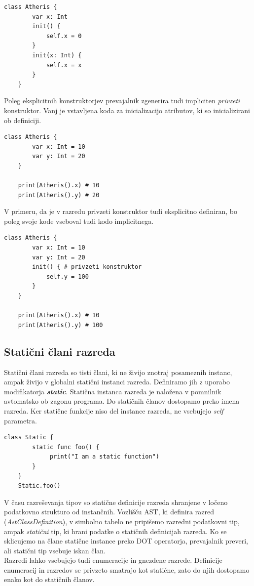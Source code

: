 \documentclass[a4paper, 12p]{book}
\begin{document}
\begin{lstlisting}[caption={Konsturktorji.}, captionpos=b]
	class Atheris {
	    var x: Int
	    init() {
	        self.x = 0
	    }
	    init(x: Int) {
	        self.x = x
	    }
	}
\end{lstlisting}

\indent Poleg eksplicitnih konstruktorjev prevajalnik zgenerira tudi impliciten \textit{privzeti} konstruktor. Vanj je vstavljena koda za inicializacijo atributov, ki so inicializirani ob definiciji. 

\begin{lstlisting}[caption={Implicitni privzeti konstruktor.}, captionpos=b]
	class Atheris {
	    var x: Int = 10
	    var y: Int = 20
	}
	
	print(Atheris().x) # 10
	print(Atheris().y) # 20
\end{lstlisting}

V primeru, da je v razredu privzeti konstruktor tudi eksplicitno definiran, bo poleg svoje kode vseboval tudi kodo implicitnega.

\begin{lstlisting}[caption={Eksplicitni privzeti konstruktor.}, captionpos=b]
	class Atheris {
	    var x: Int = 10
	    var y: Int = 20
	    init() { # privzeti konstruktor
	        self.y = 100
	    }
	}
	
	print(Atheris().x) # 10
	print(Atheris().y) # 100
\end{lstlisting}

\subsection{Statični člani razreda}

Statični člani razreda so tisti člani, ki ne živijo znotraj posameznih instanc, ampak živijo v globalni statični instanci razreda. Definiramo jih z uporabo modifikatorja \textit{\textbf{static}}. Statična instanca razreda je naložena v pomnilnik avtomatsko ob zagonu programa. Do statičnih članov dostopamo preko imena razreda. Ker statične funkcije niso del instance razreda, ne vsebujejo \textit{self} parametra.

\begin{lstlisting}[caption={Klicanje statične funkcije.}, captionpos=b]
	class Static {
   	    static func foo() {
	         print("I am a static function")
	    }
	} 
	Static.foo()
\end{lstlisting}

\indent V času razreševanja tipov so statične definicije razreda shranjene v ločeno podatkovno strukturo od instančnih. Vozlišču AST, ki definira razred (\textit{AstClassDefinition}), v simbolno tabelo ne pripišemo razredni podatkovni tip, ampak \textit{statični} tip, ki hrani podatke o statičnih definicijah razreda. Ko se sklicujemo na člane statične instance preko DOT operatorja, prevajalnik preveri, ali statični tip vsebuje iskan član.\\
\indent Razredi lahko vsebujejo tudi enumeracije in gnezdene razrede. Definicije enumeracij in razredov se privzeto smatrajo kot statične, zato do njih dostopamo enako kot do statičnih članov. 
\end{document}
